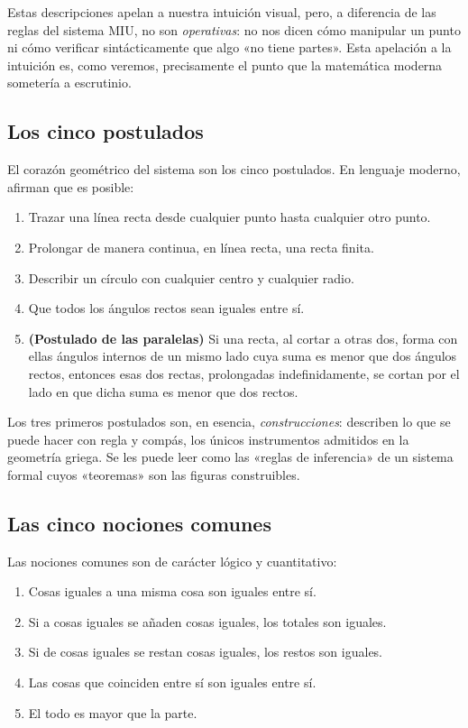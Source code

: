 Estas descripciones apelan a nuestra intuición visual, pero, a diferencia de las reglas del sistema MIU, no son
\emph{operativas}: no nos dicen cómo manipular un punto ni cómo verificar sintácticamente que algo «no tiene partes».
Esta apelación a la intuición es, como veremos, precisamente el punto que la matemática moderna sometería a escrutinio.

\subsection{Los cinco postulados}

El corazón geométrico del sistema son los cinco postulados. En lenguaje moderno, afirman
que es posible:

\begin{enumerate}
    \item Trazar una línea recta desde cualquier punto hasta cualquier otro punto.
    \item Prolongar de manera continua, en línea recta, una recta finita.
    \item Describir un círculo con cualquier centro y cualquier radio.
    \item Que todos los ángulos rectos sean iguales entre sí.
    \item \textbf{(Postulado de las paralelas)} Si una recta, al cortar a otras dos, forma con ellas ángulos internos
          de un mismo lado cuya suma es menor que dos ángulos rectos, entonces esas dos rectas, prolongadas
          indefinidamente, se cortan por el lado en que dicha suma es menor que dos rectos.
\end{enumerate}

Los tres primeros postulados son, en esencia, \emph{construcciones}: describen lo que se puede hacer con regla y
compás, los únicos instrumentos admitidos en la geometría griega. Se les puede leer como las «reglas de inferencia» de
un sistema formal cuyos «teoremas» son las figuras construibles.

\subsection{Las cinco nociones comunes}

Las nociones comunes son de carácter lógico y cuantitativo:

\begin{enumerate}
    \item Cosas iguales a una misma cosa son iguales entre sí.
    \item Si a cosas iguales se añaden cosas iguales, los totales son iguales.
    \item Si de cosas iguales se restan cosas iguales, los restos son iguales.
    \item Las cosas que coinciden entre sí son iguales entre sí.
    \item El todo es mayor que la parte.
\end{enumerate}

